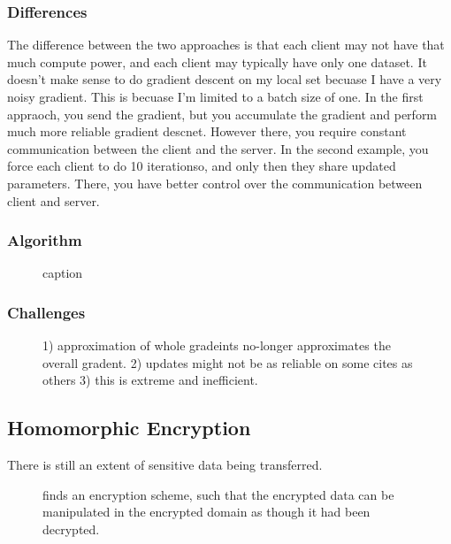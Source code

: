 \documentclass[11pt]{article}
\begin{document}
\subsubsection{Differences}

The difference between the two approaches is that each client may not have that much compute power, and each client may typically have only one dataset. It doesn't make sense to do gradient descent on my local set becuase I have a very noisy gradient. This is becuase I'm limited to a batch size of one. In the first appraoch, you send the gradient, but you accumulate the gradient and perform much more reliable gradient descnet. However there, you require constant communication between the client and the server. In the second example, you force each client to do 10 iterationso, and only then they share updated parameters. There, you have better control over the communication between client and server.

\subsubsection{Algorithm}

\begin{figure}[H]
    \centering
    \caption{caption}
\end{figure}

\subsubsection{Challenges}

\begin{figure}[H]
    \centering
    \caption{1) approximation of whole gradeints no-longer approximates the overall gradent. 2) updates might not be as reliable on some cites as others 3) this is extreme and inefficient.}
\end{figure}

\subsection{Homomorphic Encryption}

There is still an extent of sensitive data being transferred.

\begin{figure}[H]
    \centering
    \caption{finds an encryption scheme, such that the encrypted data can be manipulated in the encrypted domain as though it had been decrypted.}
\end{figure}
\end{document}
